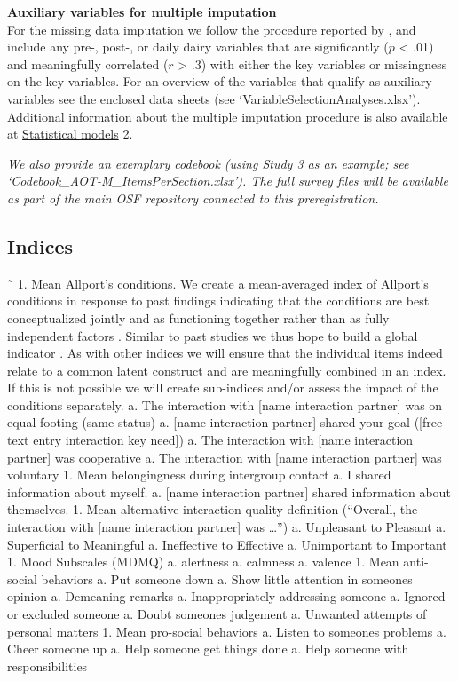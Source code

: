 \documentclass[]{article}
\begin{document}
\textbf{Auxiliary variables for multiple imputation}\\
For the missing data imputation we follow the procedure reported by
\citet{Monden2015}, and include any pre-, post-, or daily dairy
variables that are significantly (\(p\) \textless{} .01) and
meaningfully correlated (\(r\) \textgreater{} .3) with either the key
variables or missingness on the key variables. For an overview of the
variables that qualify as auxiliary variables see the enclosed data
sheets (see `VariableSelectionAnalyses.xlsx'). Additional information
about the multiple imputation procedure is also available at
\protect\hyperlink{statistical-models}{Statistical models} 2.

\emph{We also provide an exemplary codebook (using Study 3 as an
example; see `Codebook\_AOT-M\_ItemsPerSection.xlsx'). The full survey
files will be available as part of the main OSF repository connected to
this preregistration.}

\hypertarget{indices}{%
\subsection{Indices}\label{indices}}

˜ 1. Mean Allport's conditions. We create a mean-averaged index of
Allport's conditions in response to past findings indicating that the
conditions are best conceptualized jointly and as functioning together
rather than as fully independent factors \citep[p.~766]{Pettigrew2006}.
Similar to past studies we thus hope to build a global indicator
\citep[e.g., see][]{Pettigrew2006}. As with other indices we will ensure
that the individual items indeed relate to a common latent construct and
are meaningfully combined in an index. If this is not possible we will
create sub-indices and/or assess the impact of the conditions
separately. a. The interaction with {[}name interaction partner{]} was
on equal footing (same status) a. {[}name interaction partner{]} shared
your goal ({[}free-text entry interaction key need{]}) a. The
interaction with {[}name interaction partner{]} was cooperative a. The
interaction with {[}name interaction partner{]} was voluntary 1. Mean
belongingness during intergroup contact a. I shared information about
myself. a. {[}name interaction partner{]} shared information about
themselves. 1. Mean alternative interaction quality definition
(``Overall, the interaction with {[}name interaction partner{]} was
\ldots{}'') a. Unpleasant to Pleasant a. Superficial to Meaningful a.
Ineffective to Effective a. Unimportant to Important 1. Mood Subscales
(MDMQ) a. alertness a. calmness a. valence 1. Mean anti-social behaviors
a. Put someone down a. Show little attention in someones opinion a.
Demeaning remarks a. Inappropriately addressing someone a. Ignored or
excluded someone a. Doubt someones judgement a. Unwanted attempts of
personal matters 1. Mean pro-social behaviors a. Listen to someones
problems a. Cheer someone up a. Help someone get things done a. Help
someone with responsibilities
\end{document}
